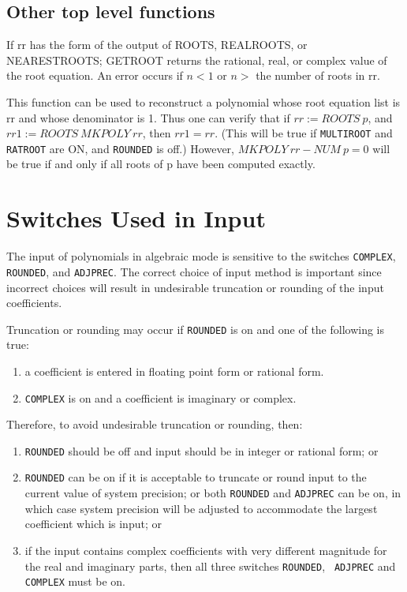 \subsection{Other top level functions}

\begin{description}
\item[GETROOT(n,rr);] If rr has the form of the output of ROOTS, REALROOTS,
or NEARESTROOTS; GETROOT returns the rational, real, or complex value of
the root equation.  An error occurs if $n<1$ or $n>$ the number of roots in
rr.

\item[MKPOLY rr;] This function can be used to reconstruct a polynomial
whose root equation list is rr and whose denominator is 1.  Thus one can
verify that if $rr := ROOTS~p$, and $rr1 := ROOTS~MKPOLY~rr$, then
$rr1 = rr$. (This will be true if {\tt MULTIROOT} and {\tt RATROOT} are ON,
and {\tt ROUNDED} is off.)
However, $MKPOLY~rr - NUM~p = 0$ will be true if and only if all roots of p
have been computed exactly.

\end{description}

\section{Switches Used in Input}

The input of polynomials in algebraic mode is sensitive to the switches
{\tt COMPLEX}, {\tt ROUNDED}, and {\tt ADJPREC}.  The correct choice of
input method is important since incorrect choices will result in
undesirable truncation or rounding of the input coefficients.

Truncation or rounding may occur if {\tt ROUNDED} is on and
one of the following is true:

\begin{enumerate}
\item a coefficient is entered in floating point form or rational form.
\item {\tt COMPLEX} is on and a coefficient is imaginary or complex.
\end{enumerate}

Therefore, to avoid undesirable truncation or rounding, then:

\begin{enumerate}
\item {\tt ROUNDED} should be off and input should be
in integer or rational form; or
\item {\tt ROUNDED} can be on if it is acceptable to truncate or round
input to the current value of system precision; or both {\tt ROUNDED} and
{\tt ADJPREC} can be on, in which case system precision will be adjusted
to accommodate the largest coefficient which is input; or \item if the
input contains complex coefficients with very different magnitude for the
real and imaginary parts, then all three switches {\tt ROUNDED}, {\tt
ADJPREC} and {\tt COMPLEX} must be on.
\end{enumerate}

